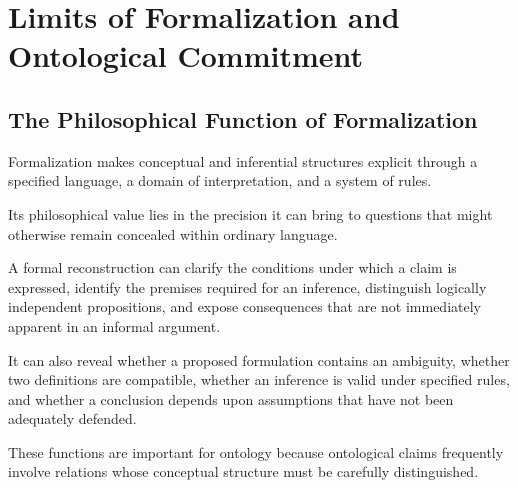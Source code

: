 %
%
%
%

\section{Limits of Formalization and Ontological Commitment}
\label{sec:limits-of-formalization-and-ontological-commitment}

\subsection{The Philosophical Function of Formalization}

Formalization makes conceptual and inferential structures
explicit through a specified language, a domain of
interpretation, and a system of rules.

Its philosophical value lies in the precision it can
bring to questions that might otherwise remain concealed
within ordinary language.

A formal reconstruction can clarify the conditions
under which a claim is expressed, identify the premises
required for an inference, distinguish logically
independent propositions, and expose consequences
that are not immediately apparent in an informal
argument.

It can also reveal whether a proposed formulation
contains an ambiguity, whether two definitions
are compatible, whether an inference is valid
under specified rules, and whether a conclusion
depends upon assumptions that have not been
adequately defended.

These functions are important for ontology because
ontological claims frequently involve relations
whose conceptual structure must be carefully
distinguished.

